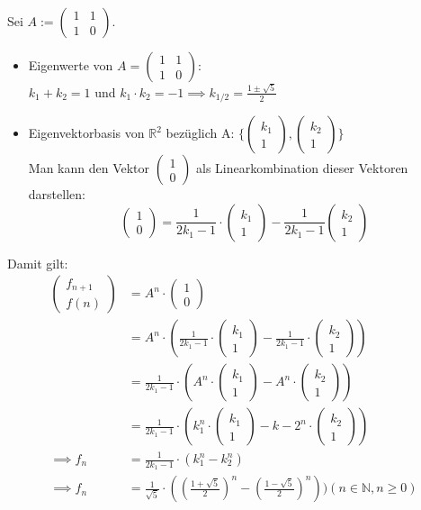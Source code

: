 \documentclass{article}
\newcommand{\N}{\mathbb{N}}
\newcommand{\R}{\mathbb{R}}
\newcommand{\vvec}[2]{\begin{pmatrix}#1\\#2\end{pmatrix}}
\begin{document}
\newpage
Sei $A := \begin{pmatrix}
    1 & 1\\
    1 & 0
\end{pmatrix}$.
\begin{itemize}
    \item Eigenwerte von $A = \begin{pmatrix}
        1 & 1\\
        1 & 0
    \end{pmatrix}:$\\
    $k_1 + k_2 = 1$ und $k_1 \cdot k_2 = -1 \implies k_{1/2} = \frac{1 \pm \sqrt{5}}{2}$
    \item Eigenvektorbasis von $\R^2$ bezüglich A: $\{\vvec{k_1}{1}, \vvec{k_2}{1}\}$\\
    Man kann den Vektor $\vvec{1}{0}$ als Linearkombination dieser Vektoren\\
    darstellen:
    \[
        \vvec{1}{0} = \frac{1}{2k_1-1} \cdot \vvec{k_1}{1} - \frac{1}{2k_1-1} \vvec{k_2}{1}
    \]
\end{itemize}
Damit gilt:
\begin{align*}
    \vvec{f_{n+1}}{f(n)} &= A^n \cdot \vvec{1}{0}\\
    &= A^n \cdot (\frac{1}{2k_1-1} \cdot \vvec{k_1}{1} - \frac{1}{2k_1-1} \cdot \vvec{k_2}{1})\\
    &= \frac{1}{2k_1-1} \cdot (A^n \cdot \vvec{k_1}{1} - A^n \cdot \vvec{k_2}{1})\\
    &= \frac{1}{2k_1-1} \cdot (k_1^n \cdot \vvec{k_1}{1} - k-2^n \cdot \vvec{k_2}{1})\\
    \implies f_n &= \frac{1}{2k_1-1} \cdot (k_1^n - k_2^n)\\
    \implies f_n &= \frac{1}{\sqrt{5}} \cdot ((\frac{1 + \sqrt{5}}{2})^n - (\frac{1 - \sqrt{5}}{2})^n)) (n \in \N, n \ge 0)
\end{align*}
\end{document}
